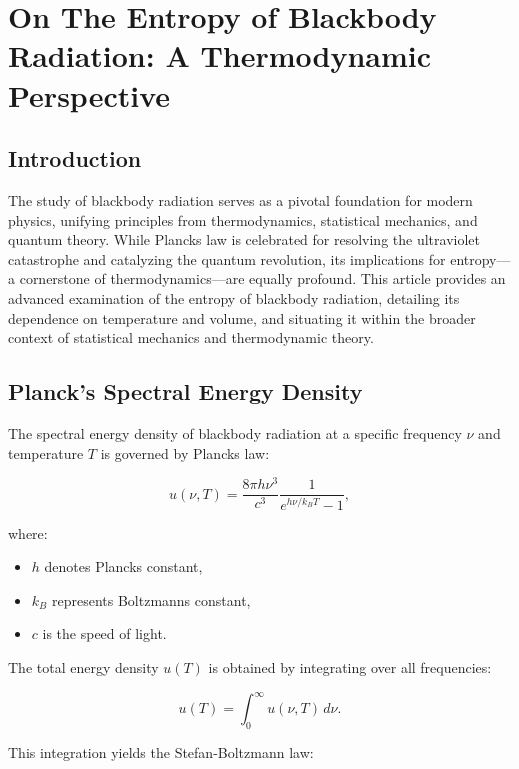 

 \section{On The Entropy of Blackbody Radiation: A Thermodynamic Perspective}

 \subsection*{Introduction}
 The study of blackbody radiation serves as a pivotal foundation for modern physics, unifying principles from thermodynamics, statistical mechanics, and quantum theory. While Planck\rqs s law is celebrated for resolving the ultraviolet catastrophe and catalyzing the quantum revolution, its implications for entropy—a cornerstone of thermodynamics—are equally profound. This article provides an advanced examination of the entropy of blackbody radiation, detailing its dependence on temperature and volume, and situating it within the broader context of statistical mechanics and thermodynamic theory.

 \subsection*{Planck's Spectral Energy Density}
 The spectral energy density of blackbody radiation at a specific frequency $\nu$ and temperature $T$ is governed by Planck\rqs s law:

 \begin{equation*}
  u(\nu, T) = \frac{8 \pi h \nu^3}{c^3} \frac{1}{e^{h \nu / k_B T} - 1},
 \end{equation*}

 where:

 \begin{itemize}
  \item $h$ denotes Planck\rqs s constant,
  \item $k_B$ represents Boltzmann\rqs s constant,
  \item $c$ is the speed of light.
 \end{itemize}

 The total energy density $u(T)$ is obtained by integrating over all frequencies:

 \begin{equation*}
  u(T) = \int_0^\infty u(\nu, T) \, d\nu.
 \end{equation*}

 This integration yields the Stefan-Boltzmann law:

